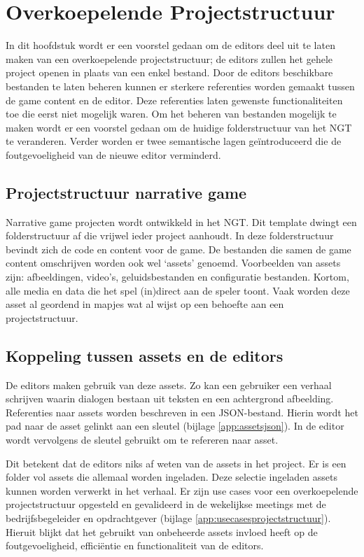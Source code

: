 \chapter{Overkoepelende Projectstructuur}
\label{ch:overkoepelendeprojectstructuur}
In dit hoofdstuk wordt er een voorstel gedaan om de editors deel uit te laten maken van een overkoepelende projectstructuur; de editors zullen het gehele project openen in plaats van een enkel bestand. Door de editors beschikbare bestanden te laten beheren kunnen er sterkere referenties worden gemaakt tussen de game content en de editor. Deze referenties laten gewenste functionaliteiten toe die eerst niet mogelijk waren. Om het beheren van bestanden mogelijk te maken wordt er een voorstel gedaan om de huidige folderstructuur van het NGT te veranderen. Verder worden er twee semantische lagen geïntroduceerd die de foutgevoeligheid van de nieuwe editor verminderd.

\section{Projectstructuur narrative game}
Narrative game projecten wordt ontwikkeld in het NGT. Dit template dwingt een folderstructuur af die vrijwel ieder project aanhoudt. In deze folderstructuur bevindt zich de code en content voor de game. De bestanden die samen de game content omschrijven worden ook wel ‘assets’ genoemd. Voorbeelden van assets zijn: afbeeldingen, video’s, geluidsbestanden en configuratie bestanden. Kortom, alle media en data die het spel (in)direct aan de speler toont. Vaak worden deze asset al geordend in mapjes wat al wijst op een behoefte aan een projectstructuur.

\section{Koppeling tussen assets en de editors}
De editors maken gebruik van deze assets. Zo kan een gebruiker een verhaal schrijven waarin dialogen bestaan uit teksten en een achtergrond afbeelding. Referenties naar assets worden beschreven in een JSON-bestand. Hierin wordt het pad naar de asset gelinkt aan een sleutel (bijlage \autoref{app:assetsjson}). In de editor wordt vervolgens de sleutel gebruikt om te refereren naar asset.

Dit betekent dat de editors niks af weten van de assets in het project. Er is een folder vol assets die allemaal worden ingeladen. Deze selectie ingeladen assets kunnen worden verwerkt in het verhaal. Er zijn use cases voor een overkoepelende projectstructuur opgesteld en gevalideerd in de wekelijkse meetings met de bedrijfsbegeleider en opdrachtgever (bijlage \autoref{app:usecasesprojectstructuur}). Hieruit blijkt dat het gebruikt van onbeheerde assets invloed heeft op de foutgevoeligheid, efficiëntie en functionaliteit van de editors. 

